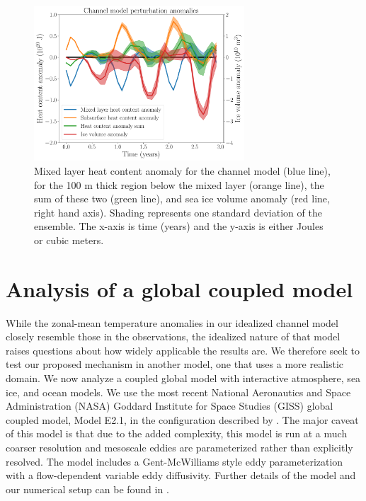 \documentclass{ametsocV5}
\begin{document}
\begin{figure}[!ht]
    \begin{center}
        \includegraphics[width=0.7\textwidth]{figures/channel_model_OHC_and_ice_anoms.pdf}
        \caption{Mixed layer heat content anomaly for the channel model (blue line), for the 100 m thick region below the mixed layer (orange line), the sum of these two (green line), and sea ice volume anomaly (red line, right hand axis). Shading represents one standard deviation of the ensemble. The x-axis is time (years) and the y-axis is either Joules or cubic meters.}
        \label{fig:channel_model_OHC_and_ice_anoms}
    \end{center}
\end{figure}



\section{Analysis of a global coupled model} %
\label{sec:analysis_of_a_global_coupled_model}

While the zonal-mean temperature anomalies in our idealized channel model closely resemble those in the observations, the idealized nature of that model raises questions about how widely applicable the results are. We therefore seek to test our proposed mechanism in another model, one that uses a more realistic domain. We now analyze a coupled global model with interactive atmosphere, sea ice, and ocean models. We use the most recent National Aeronautics and Space Administration (NASA) Goddard Institute for Space Studies (GISS) global coupled model, Model E2.1, in the configuration described by \citet{Doddridge2019a}. The major caveat of this model is that due to the added complexity, this model is run at a much coarser resolution and mesoscale eddies are parameterized rather than explicitly resolved. The model includes a Gent-McWilliams style eddy parameterization \citep{Gent1990,Gent1995} with a flow-dependent variable eddy diffusivity. Further details of the model and our numerical setup can be found in \citet{Doddridge2019a}.
\end{document}
